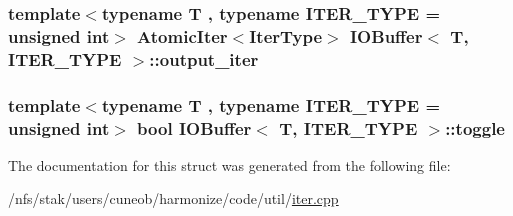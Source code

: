 \hypertarget{structIOBuffer_aff9c8b064ee173136abd76ff4cbc1e50}{
\subsubsection[{output\-\_\-iter}]{\setlength{\rightskip}{0pt plus 5cm}template$<$typename T , typename I\-T\-E\-R\-\_\-\-T\-Y\-P\-E  = unsigned int$>$ {\bf Atomic\-Iter}$<${\bf Iter\-Type}$>$ {\bf I\-O\-Buffer}$<$ T, I\-T\-E\-R\-\_\-\-T\-Y\-P\-E $>$\-::output\-\_\-iter}}\label{structIOBuffer_aff9c8b064ee173136abd76ff4cbc1e50}
\hypertarget{structIOBuffer_a31e25c6353b67da4d9e523de7e4f502b}{
\subsubsection[{toggle}]{\setlength{\rightskip}{0pt plus 5cm}template$<$typename T , typename I\-T\-E\-R\-\_\-\-T\-Y\-P\-E  = unsigned int$>$ bool {\bf I\-O\-Buffer}$<$ T, I\-T\-E\-R\-\_\-\-T\-Y\-P\-E $>$\-::toggle}}\label{structIOBuffer_a31e25c6353b67da4d9e523de7e4f502b}


The documentation for this struct was generated from the following file\-:\begin{DoxyCompactItemize}
\item 
/nfs/stak/users/cuneob/harmonize/code/util/\hyperlink{iter_8cpp}{iter.\-cpp}\end{DoxyCompactItemize}
